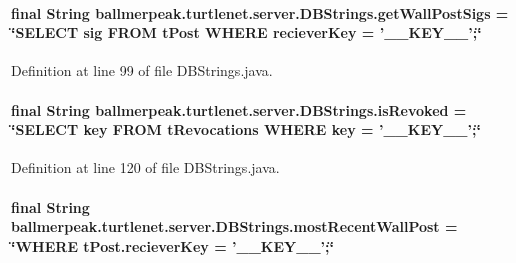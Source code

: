 \hypertarget{classballmerpeak_1_1turtlenet_1_1server_1_1DBStrings_abc7b51ce40123124593dc92582e256b0}{
\paragraph[{get\-Wall\-Post\-Sigs}]{\setlength{\rightskip}{0pt plus 5cm}final String ballmerpeak.\-turtlenet.\-server.\-D\-B\-Strings.\-get\-Wall\-Post\-Sigs = \char`\"{}S\-E\-L\-E\-C\-T sig F\-R\-O\-M t\-Post W\-H\-E\-R\-E reciever\-Key = '\-\_\-\-\_\-\-K\-E\-Y\-\_\-\-\_\-';\char`\"{}\hspace{0.3cm}{\ttfamily [static]}}}\label{classballmerpeak_1_1turtlenet_1_1server_1_1DBStrings_abc7b51ce40123124593dc92582e256b0}


Definition at line 99 of file D\-B\-Strings.\-java.

\hypertarget{classballmerpeak_1_1turtlenet_1_1server_1_1DBStrings_a18c48137c57f21cff5ba853fbf5f524f}{
\paragraph[{is\-Revoked}]{\setlength{\rightskip}{0pt plus 5cm}final String ballmerpeak.\-turtlenet.\-server.\-D\-B\-Strings.\-is\-Revoked = \char`\"{}S\-E\-L\-E\-C\-T key F\-R\-O\-M t\-Revocations W\-H\-E\-R\-E key = '\-\_\-\-\_\-\-K\-E\-Y\-\_\-\-\_\-';\char`\"{}\hspace{0.3cm}{\ttfamily [static]}}}\label{classballmerpeak_1_1turtlenet_1_1server_1_1DBStrings_a18c48137c57f21cff5ba853fbf5f524f}


Definition at line 120 of file D\-B\-Strings.\-java.

\hypertarget{classballmerpeak_1_1turtlenet_1_1server_1_1DBStrings_ad9c0536856622b589ca1c0877681c86c}{
\paragraph[{most\-Recent\-Wall\-Post}]{\setlength{\rightskip}{0pt plus 5cm}final String ballmerpeak.\-turtlenet.\-server.\-D\-B\-Strings.\-most\-Recent\-Wall\-Post = \char`\"{}W\-H\-E\-R\-E t\-Post.\-reciever\-Key = '\-\_\-\-\_\-\-K\-E\-Y\-\_\-\-\_\-';\char`\"{}\hspace{0.3cm}{\ttfamily [static]}}}\label{classballmerpeak_1_1turtlenet_1_1server_1_1DBStrings_ad9c0536856622b589ca1c0877681c86c}


